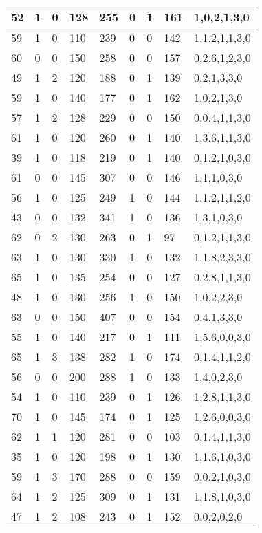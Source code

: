 \documentclass{article}
\begin{document}
\begin{table}[h!]
\begin{tabular}{|l|l|l|l|l|l|l|l|l|}
52 & 1 & 0 & 128 & 255 & 0 & 1 & 161 & 1,0,2,1,3,0 \\ \hline
59 & 1 & 0 & 110 & 239 & 0 & 0 & 142 & 1,1.2,1,1,3,0 \\ \hline
60 & 0 & 0 & 150 & 258 & 0 & 0 & 157 & 0,2.6,1,2,3,0 \\ \hline
49 & 1 & 2 & 120 & 188 & 0 & 1 & 139 & 0,2,1,3,3,0 \\ \hline
59 & 1 & 0 & 140 & 177 & 0 & 1 & 162 & 1,0,2,1,3,0 \\ \hline
57 & 1 & 2 & 128 & 229 & 0 & 0 & 150 & 0,0.4,1,1,3,0 \\ \hline
61 & 1 & 0 & 120 & 260 & 0 & 1 & 140 & 1,3.6,1,1,3,0 \\ \hline
39 & 1 & 0 & 118 & 219 & 0 & 1 & 140 & 0,1.2,1,0,3,0 \\ \hline
61 & 0 & 0 & 145 & 307 & 0 & 0 & 146 & 1,1,1,0,3,0 \\ \hline
56 & 1 & 0 & 125 & 249 & 1 & 0 & 144 & 1,1.2,1,1,2,0 \\ \hline
43 & 0 & 0 & 132 & 341 & 1 & 0 & 136 & 1,3,1,0,3,0 \\ \hline
62 & 0 & 2 & 130 & 263 & 0 & 1 & 97 & 0,1.2,1,1,3,0 \\ \hline
63 & 1 & 0 & 130 & 330 & 1 & 0 & 132 & 1,1.8,2,3,3,0 \\ \hline
65 & 1 & 0 & 135 & 254 & 0 & 0 & 127 & 0,2.8,1,1,3,0 \\ \hline
48 & 1 & 0 & 130 & 256 & 1 & 0 & 150 & 1,0,2,2,3,0 \\ \hline
63 & 0 & 0 & 150 & 407 & 0 & 0 & 154 & 0,4,1,3,3,0 \\ \hline
55 & 1 & 0 & 140 & 217 & 0 & 1 & 111 & 1,5.6,0,0,3,0 \\ \hline
65 & 1 & 3 & 138 & 282 & 1 & 0 & 174 & 0,1.4,1,1,2,0 \\ \hline
56 & 0 & 0 & 200 & 288 & 1 & 0 & 133 & 1,4,0,2,3,0 \\ \hline
54 & 1 & 0 & 110 & 239 & 0 & 1 & 126 & 1,2.8,1,1,3,0 \\ \hline
70 & 1 & 0 & 145 & 174 & 0 & 1 & 125 & 1,2.6,0,0,3,0 \\ \hline
62 & 1 & 1 & 120 & 281 & 0 & 0 & 103 & 0,1.4,1,1,3,0 \\ \hline
35 & 1 & 0 & 120 & 198 & 0 & 1 & 130 & 1,1.6,1,0,3,0 \\ \hline
59 & 1 & 3 & 170 & 288 & 0 & 0 & 159 & 0,0.2,1,0,3,0 \\ \hline
64 & 1 & 2 & 125 & 309 & 0 & 1 & 131 & 1,1.8,1,0,3,0 \\ \hline
47 & 1 & 2 & 108 & 243 & 0 & 1 & 152 & 0,0,2,0,2,0 \\ \hline

\end{tabular}
\end{table}
\end{document}
